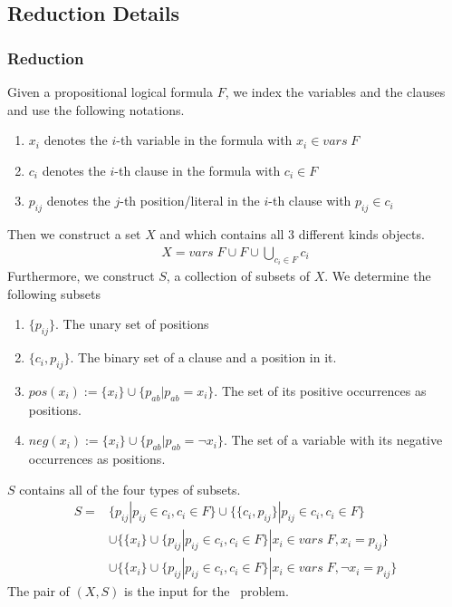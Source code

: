 \subsection{Reduction Details}
\subsubsection{Reduction}
Given a propositional logical formula $F$, we index the variables and the clauses and use the following notations.
\begin{enumerate}
    \item $x_i$ denotes the $i$-th variable in the formula with $x_i \in vars\; F$
    \item $c_i$ denotes the $i$-th clause in the formula with $c_i \in F$
    \item $p_{ij}$ denotes the $j$-th position/literal in the $i$-th clause with $p_{ij} \in c_i$
\end{enumerate} 
Then we construct a set $X$ and which contains all 3 different kinds objects. 
\begin{align*}
    X = vars\; F \cup F \cup \bigcup_{c_i \in F} c_i
\end{align*}
Furthermore, we construct $S$, a collection of subsets of $X$. We determine the following subsets
\begin{enumerate}
    \item $\{p_{ij}\}$. The unary set of positions
    \item $\{c_i, p_{ij}\}$. The binary set of a clause and a position in it.
    \item $pos(x_i) := \{x_i\} \cup \{p_{ab} | p_{ab} = x_i\}$. The set of its positive occurrences as positions.
    \item $neg(x_i):= \{x_i\} \cup \{p_{ab} | p_{ab} = \neg x_i\}$. The set of a variable with  its negative occurrences as positions.
\end{enumerate}
$S$ contains all of the four types of subsets.
\begin{align*}
    S =& \{{p_{ij}} | p_{ij} \in c_i, c_i \in F \} 
    \cup \{\{c_i, p_{ij}\} | p_{ij} \in c_i, c_i \in F \} \\
    &\cup \{\{x_i\} \cup \{p_{ij} | p_{ij} \in c_i, c_i \in F\} | x_i \in vars\; F, x_i = p_{ij}\}\\
    &\cup \{\{x_i\} \cup \{p_{ij} | p_{ij} \in c_i, c_i \in F\} | x_i \in vars\; F, \neg x_i = p_{ij}\}
\end{align*}
The pair of $(X, S)$ is the input for the \XC\ problem. 

